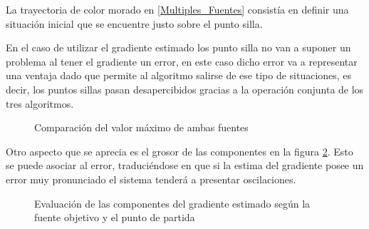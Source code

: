 La trayectoria de color morado en \ref{Multiples_Fuentes} consistía en definir una situación inicial que se encuentre justo sobre el punto silla. 

En el caso de utilizar el gradiente estimado los punto silla no van a suponer un problema al tener el gradiente un error, en este caso dicho error va a representar una ventaja dado que permite al algoritmo salirse de ese tipo de situaciones, es decir, los puntos sillas pasan desapercibidos gracias a la operación conjunta de los tres algoritmos.

\begin{figure}[H]
  \begin{center}
    \caption{Comparación del valor máximo de ambas fuentes}
    \label{Fun_Gauss_Multi}
  \end{center}
\end{figure}
Otro aspecto que se aprecia es el grosor de las componentes en la figura \ref{Comp_Multi_Gaussian}. Esto se puede asociar al error, traduciéndose en que si la estima del gradiente posee un error muy pronunciado el sistema tenderá a presentar oscilaciones.

\begin{figure}[H]
  \begin{center}
    \caption{Evaluación de las componentes del gradiente estimado según la fuente objetivo y el punto de partida}
    \label{Comp_Multi_Gaussian}
  \end{center}
\end{figure}






